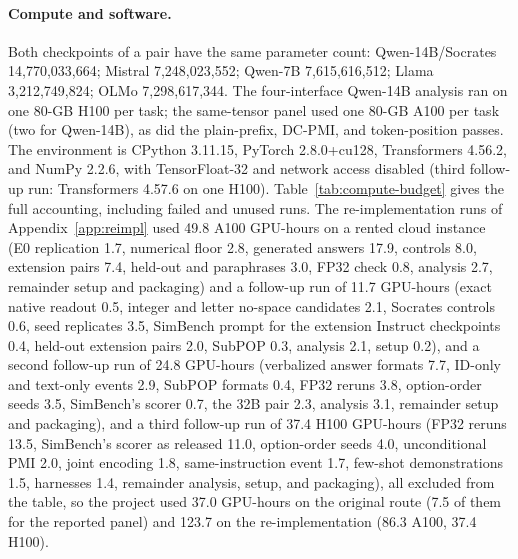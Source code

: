 \documentclass[11pt]{article}
\begin{document}
\paragraph{Compute and software.}
Both checkpoints of a pair have the same parameter count: Qwen-14B/Socrates
14,770,033,664; Mistral 7,248,023,552; Qwen-7B 7,615,616,512; Llama
3,212,749,824; OLMo 7,298,617,344. The four-interface Qwen-14B analysis ran on
one 80-GB H100 per task; the same-tensor panel used one 80-GB A100 per task
(two for Qwen-14B), as did the plain-prefix, DC-PMI, and token-position passes.
The environment is CPython 3.11.15, PyTorch 2.8.0+cu128, Transformers 4.56.2, and NumPy 2.2.6, with TensorFloat-32 and network access disabled (third follow-up run: Transformers 4.57.6 on one H100).
Table~\ref{tab:compute-budget} gives the full accounting, including failed and
unused runs. The re-implementation runs of Appendix~\ref{app:reimpl} used 49.8 A100
GPU-hours on a rented cloud instance (E0 replication 1.7, numerical floor 2.8,
generated answers 17.9, controls 8.0, extension pairs 7.4, held-out and
paraphrases 3.0, FP32 check 0.8, analysis 2.7, remainder setup and packaging)
and a follow-up run of 11.7 GPU-hours (exact native readout 0.5, integer and
letter no-space candidates 2.1, Socrates controls 0.6, seed replicates 3.5,
SimBench prompt for the extension Instruct checkpoints 0.4, held-out
extension pairs 2.0, SubPOP 0.3, analysis 2.1, setup 0.2), and a second follow-up run of 24.8 GPU-hours (verbalized answer formats 7.7, ID-only and text-only events 2.9, SubPOP formats 0.4, FP32 reruns 3.8, option-order seeds 3.5, SimBench's scorer 0.7, the 32B pair 2.3, analysis 3.1, remainder setup and packaging), and a third follow-up run of 37.4 H100 GPU-hours (FP32 reruns 13.5, SimBench's scorer as released 11.0, option-order seeds 4.0, unconditional PMI 2.0, joint encoding 1.8, same-instruction event 1.7, few-shot demonstrations 1.5, harnesses 1.4, remainder analysis, setup, and packaging), all excluded from the table, so the project used 37.0 GPU-hours on the original route (7.5 of them for the reported panel) and 123.7 on the re-implementation (86.3 A100, 37.4 H100).


\end{document}
